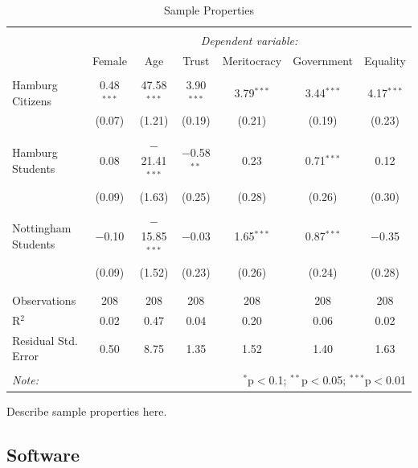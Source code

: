 \documentclass[
  authoryear,
  preprint,
  3p]{elsarticle}
\begin{document}
\hypertarget{tbl-sample-properties}{}
\begin{table}[!htbp] \centering 
  \caption{\label{tbl-sample-properties}Sample Properties } 
  \label{} 
\begin{tabular}{@{\extracolsep{5pt}}lcccccc} 
\\[-1.8ex]\hline 
\hline \\[-1.8ex] 
 & \multicolumn{6}{c}{\textit{Dependent variable:}} \\ 
\cline{2-7} 
 & Female & Age & Trust & Meritocracy & Government & Equality \\ 
\hline \\[-1.8ex] 
 Hamburg Citizens & 0.48$^{***}$ & 47.58$^{***}$ & 3.90$^{***}$ & 3.79$^{***}$ & 3.44$^{***}$ & 4.17$^{***}$ \\ 
  & (0.07) & (1.21) & (0.19) & (0.21) & (0.19) & (0.23) \\ 
  & & & & & & \\ 
 Hamburg Students & 0.08 & $-$21.41$^{***}$ & $-$0.58$^{**}$ & 0.23 & 0.71$^{***}$ & 0.12 \\ 
  & (0.09) & (1.63) & (0.25) & (0.28) & (0.26) & (0.30) \\ 
  & & & & & & \\ 
 Nottingham Students & $-$0.10 & $-$15.85$^{***}$ & $-$0.03 & 1.65$^{***}$ & 0.87$^{***}$ & $-$0.35 \\ 
  & (0.09) & (1.52) & (0.23) & (0.26) & (0.24) & (0.28) \\ 
  & & & & & & \\ 
\hline \\[-1.8ex] 
Observations & 208 & 208 & 208 & 208 & 208 & 208 \\ 
R$^{2}$ & 0.02 & 0.47 & 0.04 & 0.20 & 0.06 & 0.02 \\ 
Residual Std. Error & 0.50 & 8.75 & 1.35 & 1.52 & 1.40 & 1.63 \\ 
\hline 
\hline \\[-1.8ex] 
\textit{Note:}  & \multicolumn{6}{r}{$^{*}$p$<$0.1; $^{**}$p$<$0.05; $^{***}$p$<$0.01} \\ 
\end{tabular} 
\end{table}

Describe sample properties here.

\hypertarget{sec-software}{%
\subsection{Software}\label{sec-software}}
\end{document}
